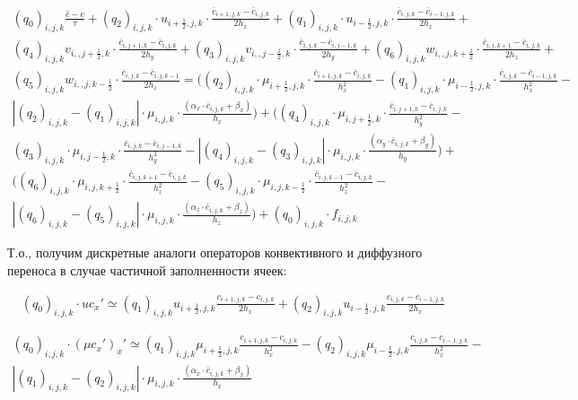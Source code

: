 \documentclass[12pt]{article}
\begin{document}
\begin{multline} 
	(q_0)_{i,j,k}\frac{\hat{c}-c}{\tau} + (q_2)_{i,j,k}\cdot u_{i+\frac{1}{2},j,k} \cdot \frac{\bar{c}_{i+1,j,k}-\bar{c}_{i,j,k}}{2h_x}   + (q_1)_{i,j,k}\cdot u_{i-\frac{1}{2},j,k} \cdot \frac{\bar{c}_{i,j,k}-\bar{c}_{i-1,j,k}}{2h_x} + \\ (q_4)_{i,j,k}v_{i,,j+\frac{1}{2},k}\cdot\frac{\bar{c}_{i,j+1,k}-\bar{c}_{i,j,k}}{2h_y} + (q_3)_{i,j,k}v_{i,,j-\frac{1}{2},k}\cdot\frac{\bar{c}_{i,j,k}-\bar{c}_{i,j-1,k}}{2h_y} + (q_6)_{i,j,k}w_{i,,j,k+\frac{1}{2}}\cdot\frac{\bar{c}_{i,j,k+1}-\bar{c}_{i,j,k}}{2h_z} + \\ (q_5)_{i,j,k}w_{i,,j,k-\frac{1}{2}}\cdot\frac{\bar{c}_{i,j,k}-\bar{c}_{i,j,k-1}}{2h_z} = ( (q_2)_{i,j,k}\cdot\mu_{i+\frac{1}{2},j,k}\cdot \frac{\bar{c}_{i+1,j,k}-\bar{c}_{i,j,k}}{h_x^2} -  (q_1)_{i,j,k}\cdot\mu_{i-\frac{1}{2},j,k}\cdot \frac{\bar{c}_{i,j,k}-\bar{c}_{i-1,j,k}}{h_x^2} - \\
	|(q_2)_{i,j,k}-(q_1)_{i,j,k}| \cdot \mu_{i,j,k}\cdot \frac{(\alpha_x\cdot\bar{c}_{i,j,k}+\beta_x)}{h_x} ) + ((q_4)_{i,j,k}\cdot\mu_{i,j+\frac{1}{2},k}\cdot \frac{\bar{c}_{i,j+1,k}-\bar{c}_{i,j,k}}{h_y^2} - \\ (q_3)_{i,j,k}\cdot\mu_{i,j-\frac{1}{2},k}\cdot \frac{\bar{c}_{i,j,k}-\bar{c}_{i,j-1,k}}{h_y^2} - |(q_4)_{i,j,k} - (q_3)_{i,j,k}| \cdot \mu_{i,j,k}\cdot \frac{(\alpha_y\cdot\bar{c}_{i,j,k}+\beta_y)}{h_y} ) + \\
	( (q_6)_{i,j,k}\cdot\mu_{i,j,k+\frac{1}{2}}\cdot \frac{\bar{c}_{i,j,k+1}-\bar{c}_{i,j,k}}{h_z^2} - 	 (q_5)_{i,j,k}\cdot\mu_{i,j,k-\frac{1}{2}}\cdot \frac{\bar{c}_{i,j,k-1}-\bar{c}_{i,j,k}}{h_z^2} - \\ |(q_6)_{i,j,k} - (q_5)_{i,j,k}| \cdot\mu_{i,j,k}\cdot \frac{(\alpha_z\cdot\bar{c}_{i,j,k}+\beta_z)}{h_z} ) + (q_0)_{i,j,k}\cdot f_{i,j,k}
\end{multline} 

 Т.о., получим дискретные аналоги операторов конвективного и диффузного переноса в случае частичной заполненности ячеек:
 
\begin{multline*} 
	(q_0)_{i,j,k}\cdot uc_x'\simeq (q_1)_{i,j,k}u_{i+\frac{1}{2},j,k}\frac{c_{i+1,j,k}-c_{i,j,k}}{2h_x} + (q_2)_{i,j,k}u_{i-\frac{1}{2},j,k}\frac{c_{i,j,k}-c_{i-1,j,k}}{2h_x}
\end{multline*} 	
 
 \begin{multline*} 
 	(q_0)_{i,j,k}\cdot (\mu c_x')_x'\simeq (q_1)_{i,j,k}\mu _{i+\frac{1}{2},j,k}\frac{c_{i+1,j,k}-c_{i,j,k}}{h_x^2} - (q_2)_{i,j,k}\mu _{i-\frac{1}{2},j,k}\frac{c_{i,j,k}-c_{i-1,j,k}}{h_x^2} - \\
 	|(q_1)_{i,j,k}-(q_2)_{i,j,k}| \cdot \mu_{i,j,k}\cdot \frac{(\alpha_x\cdot\bar{c}_{i,j,k}+\beta_x)}{h_x} 
 \end{multline*} 
 
\end{document}

